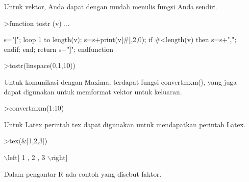 \documentclass[a4paper,10pt]{article}
\begin{document}
\begin{eulernotebook}
\begin{eulercomment}
\begin{eulercomment}
\begin{eulercomment}
\begin{eulercomment}
\begin{eulercomment}
\begin{eulercomment}
\begin{eulercomment}
Untuk vektor, Anda dapat dengan mudah menulis fungsi Anda sendiri.
\end{eulercomment}
\begin{eulerprompt}
>function tostr (v) ...
\end{eulerprompt}
\begin{eulerudf}
  s="[";
  loop 1 to length(v);
     s=s+print(v[#],2,0);
     if #<length(v) then s=s+","; endif;
  end;
  return s+"]";
  endfunction
\end{eulerudf}
\begin{eulerprompt}
>tostr(linspace(0,1,10))
\end{eulerprompt}
\begin{euleroutput}
  [0.00,0.10,0.20,0.30,0.40,0.50,0.60,0.70,0.80,0.90,1.00]
\end{euleroutput}
\begin{eulercomment}
Untuk komunikasi dengan Maxima, terdapat fungsi convertmxm(), yang
juga dapat digunakan untuk memformat vektor untuk keluaran.
\end{eulercomment}
\begin{eulerprompt}
>convertmxm(1:10)
\end{eulerprompt}
\begin{euleroutput}
  [1,2,3,4,5,6,7,8,9,10]
\end{euleroutput}
\begin{eulercomment}
Untuk Latex perintah tex dapat digunakan untuk mendapatkan perintah
Latex.
\end{eulercomment}
\begin{eulerprompt}
>tex(&[1,2,3])
\end{eulerprompt}
\begin{euleroutput}
  \(\backslash\)left[ 1 , 2 , 3 \(\backslash\)right] 
\end{euleroutput}
\begin{eulercomment}
Dalam pengantar R ada contoh yang disebut faktor.


\end{eulercomment}
\end{eulercomment}
\end{eulercomment}
\end{eulercomment}
\end{eulercomment}
\end{eulercomment}
\end{eulercomment}
\end{eulernotebook}
\end{document}

